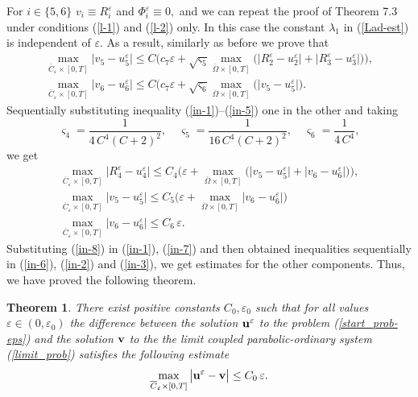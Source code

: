\documentclass[reqno]{amsart}            %
\newtheorem{theorem}{Theorem}[section]
\numberwithin{equation}{section}
\begin{document}
For $i\in\{5, 6\}$ $v_i \equiv R^\varepsilon_i$ and $\Phi^\varepsilon_i\equiv 0,$ and we can repeat the proof of Theorem 7.3~\cite{LadColUra}
under conditions (\ref{l-1}) and (\ref{l-2}) only. In this case the constant $\lambda_1$ in (\ref{Lad-est}) is independent of $\varepsilon.$ As a result,
similarly as before we prove that
\begin{gather}
  \max_{\overline{C}_\varepsilon\times [0,T]} \big|v_5 -  u^\varepsilon_5 \big| \le
  C \Big( c_7 \varepsilon
 +\sqrt{\varsigma_5} \max_{\overline{\Omega}\times [0,T]}\big(\big|R^\varepsilon_2 -  u^\varepsilon_2 \big|+ \big|R^\varepsilon_3 -  u^\varepsilon_3 \big|\big)\Big),
  \\ \label{in-5}
\max_{\overline{C}_\varepsilon\times [0,T]} \big|v_6 -  u^\varepsilon_6 \big| \le
  C \Big( c_7 \varepsilon + \sqrt{\varsigma_6} \max_{\overline{\Omega}\times [0,T]}\big(\big|v_5 -  u^\varepsilon_5 \big|\Big).
 \end{gather}
Sequentially substituting inequality (\ref{in-1})--(\ref{in-5}) one in the other  and taking
$$
\varsigma_4= \frac{1}{4 \,C^4(C+2)^2},\quad \varsigma_5= \frac{1}{16 \,C^4(C+2)^2},\quad \varsigma_6= \frac{1}{4 \,C^4},
$$
we get
\begin{gather}\label{in-6}
   \max_{\overline{C}_\varepsilon\times [0,T]} \big|R^\varepsilon_4 -  u^\varepsilon_4 \big| \le
  C_4\Big( \varepsilon
  +  \max_{\overline{\Omega}\times [0,T]}\big(\big|v_5 -  u^\varepsilon_5 \big|+ \big|v_6 -  u^\varepsilon_6 \big| \big)\Big),
  \\ \label{in-7}
  \max_{\overline{C}_\varepsilon\times [0,T]} \big|v_5 -  u^\varepsilon_5 \big| \le
  C_5 \Big(  \varepsilon  + \max_{\overline{\Omega}\times [0,T]} \big|v_6 -  u^\varepsilon_6 \big|\Big)
  \\ \label{in-8}
\max_{\overline{C}_\varepsilon\times [0,T]} \big|v_6 -  u^\varepsilon_6 \big|  \le C_6 \, \varepsilon.
\end{gather}
Substituting (\ref{in-8}) in (\ref{in-1}), (\ref{in-7}) and then  obtained inequalities sequentially
in (\ref{in-6}), (\ref{in-2}) and (\ref{in-3}), we get  estimates for the other components.
Thus, we have proved the following theorem.
\begin{theorem}\label{mainTheorem}
There exist positive constants $C_0, \varepsilon_0$ such that for all values $\varepsilon\in (0, \varepsilon_0)$ the difference between the solution
${\bf u}^\varepsilon$ to the problem (\ref{start_prob-eps}) and the solution ${\bf v}$ to the
the limit coupled parabolic-ordinary system (\ref{limit_prob}) satisfies the following estimate
\begin{equation}\label{main-estmate}
 \max_{\overline{C}_\varepsilon\times [0,T]} \big|{\bf u}^\varepsilon - {\bf v} \big| \le C_0 \, \varepsilon.
\end{equation}
\end{theorem}
\end{document}
